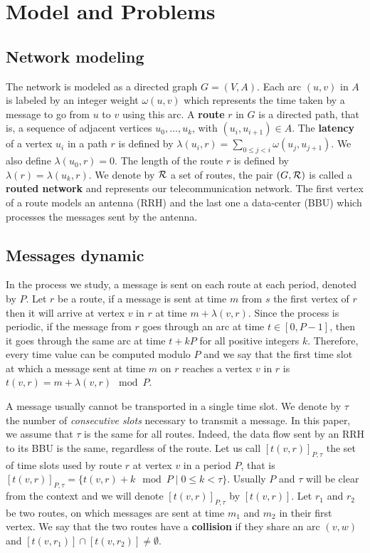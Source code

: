 \documentclass[10pt, conference, letterpaper]{IEEEtran}
\begin{document}
\section{Model and Problems}\label{sec:def}

  \subsection{Network modeling}
  

The network is modeled as a directed graph $G=(V,A)$. Each arc  $(u,v)$ in $A$ is labeled by an integer weight $\omega(u,v)$ which represents the time taken by a message to go from $u$ to $v$ using this arc. A {\bf route} $r$ in $G$ is a directed path, that is, a sequence of adjacent vertices $u_0, \ldots , u_{k}$, with $(u_i,u_{i+1}) \in A$.  The {\bf latency} of a vertex $u_i$ in a path $r$ is defined by $\lambda(u_i,r)= \sum\limits_{0 \leq j <i} \omega(u_j, u_{j+1})$. We also define $\lambda(u_0,r)=0$. The length of the route $r$ is defined by $\lambda (r)= \lambda (u_k,r)$.
We denote by $\cal R$ a set of routes, the pair $(G,\cal R)$ is called a {\bf routed network} and represents our telecommunication network.
The first vertex of a route models an antenna (RRH) and the last one a data-center (BBU) which processes the messages sent by the antenna.

   \subsection{Messages dynamic}
      
      In the process we study, a message is sent on each route at each period, denoted by $P$.
      Let $r$ be a route, if a message is sent at time $m$ from $s$ the first vertex of $r$ then it will arrive at vertex $v$ in $r$ at time $m + \lambda(v,r)$. Since the process is periodic, if the message from $r$ goes through an arc at time $t\in [0,P-1]$, 
      then it goes through the same arc at time $t+kP$ for all positive integers $k$. Therefore, every time value can be computed modulo $P$ and we say that the first time slot at which a message sent at time $m$ on $r$ reaches a vertex $v$ in $r$ is $t(v,r) = m + \lambda(v,r)\mod P$. 
      
      A message usually cannot be transported in a single time slot. We denote by $\tau$ the number 
      of \emph{consecutive slots} necessary to transmit a message. In this paper, we assume that $\tau$ is the same for all routes. Indeed, the data flow sent by an RRH to its BBU is the same, regardless of the route. Let us call $[t(v,r)]_{P,\tau}$ the set of time slots used by route $r$ at vertex $v$ in a period $P$, that is $[t(v,r)]_{P,\tau} = \{t(v,r) + k \mod P \mid 0 \leq k < \tau \}$. Usually $P$ and $\tau$ will be clear from the context and we will denote $[t(v,r)]_{P,\tau}$ by $[t(v,r)]$.
      Let $r_1$ and $r_2$ be two routes, on which messages are sent at time $m_1$ and $m_2$ in their first vertex.
      We say that the two routes have a {\bf collision} if they share an arc $(v,w)$ and $[t(v,r_{1})] \cap [t(v,r_{2})] \neq \emptyset$.
      
\end{document}
